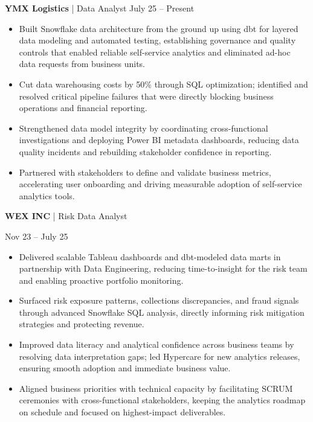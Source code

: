 \documentclass[9pt, letterpaper]{article}
\begin{document}
	\noindent \textbf{YMX Logistics} | Data Analyst \hfill July 25 -- Present
	\begin{itemize}[noitemsep, topsep=1pt, leftmargin=1.5em, rightmargin=0.5cm]
		\item Built Snowflake data architecture from the ground up using dbt for layered data modeling and automated testing, establishing governance and quality controls that enabled reliable self-service analytics and eliminated ad-hoc data requests from business units.
		\item Cut data warehousing costs by 50\% through SQL optimization; identified and resolved critical pipeline failures that were directly blocking business operations and financial reporting.
		\item Strengthened data model integrity by coordinating cross-functional investigations and deploying Power BI metadata dashboards, reducing data quality incidents and rebuilding stakeholder confidence in reporting.
		\item Partnered with stakeholders to define and validate business metrics, accelerating user onboarding and driving measurable adoption of self-service analytics tools.
	\end{itemize}

	\noindent \begin{minipage}[t]{0.75\textwidth}
		\textbf{WEX INC} | Risk Data Analyst
	\end{minipage}
	\begin{minipage}[t]{0.25\textwidth}
		\raggedleft Nov 23 -- July 25
	\end{minipage}

	\begin{itemize}[noitemsep, topsep=1pt, leftmargin=1.5em, rightmargin=0.5cm]
		\item Delivered scalable Tableau dashboards and dbt-modeled data marts in partnership with Data Engineering, reducing time-to-insight for the risk team and enabling proactive portfolio monitoring.
		\item Surfaced risk exposure patterns, collections discrepancies, and fraud signals through advanced Snowflake SQL analysis, directly informing risk mitigation strategies and protecting revenue.
		\item Improved data literacy and analytical confidence across business teams by resolving data interpretation gaps; led Hypercare for new analytics releases, ensuring smooth adoption and immediate business value.
		\item Aligned business priorities with technical capacity by facilitating SCRUM ceremonies with cross-functional stakeholders, keeping the analytics roadmap on schedule and focused on highest-impact deliverables.
	\end{itemize}
\end{document}
